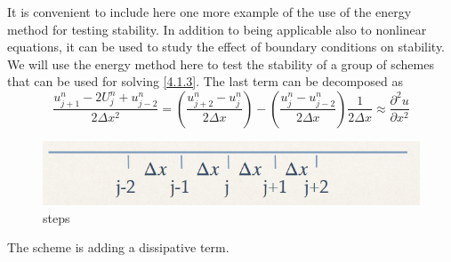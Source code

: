 It is convenient to include here one more example of the use of the energy method for testing stability. In addition to being applicable also to nonlinear equations, it can be used to study the effect of boundary conditions on stability. We will use the energy method here to test the stability of a group of schemes that can be used for solving \ref{4.1.3}.
The last term can be decomposed as 
\begin{equation}
    \frac{u_{j+1}^n-2U_j^n+u_{j-2}^n}{2\Delta x^2}=\left(\frac{u^n_{j+2}-u^n_j}{2\Delta x}\right)-\left(\frac{u_j^n-u^n_{j-2}}{2\Delta x}\right)\frac{1}{2\Delta x}\approx \frac{\partial^2u}{\partial x^2}
\end{equation}
\begin{figure}[h]
    \centering
    \includegraphics[width=0.5\linewidth]{uploads/Screenshot 2024-11-12 151817.png}
    \caption{steps}
    \label{fig:step}
\end{figure}
The scheme is adding a dissipative term. 
